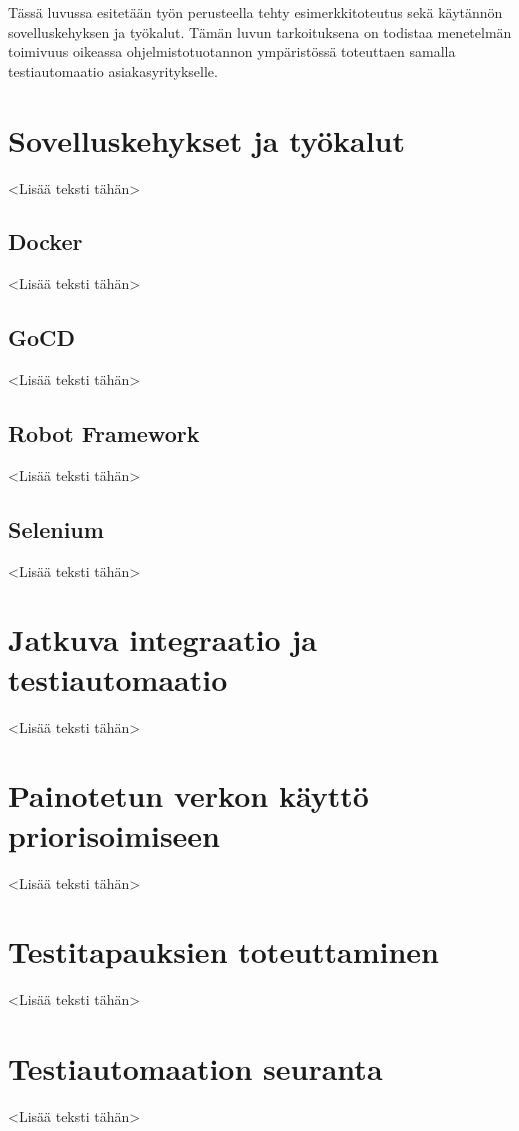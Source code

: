 Tässä luvussa esitetään työn perusteella tehty esimerkkitoteutus sekä käytännön sovelluskehyksen ja työkalut.
Tämän luvun tarkoituksena on todistaa menetelmän toimivuus oikeassa ohjelmistotuotannon ympäristössä toteuttaen samalla testiautomaatio asiakasyritykselle.

\section{Sovelluskehykset ja työkalut}

<Lisää teksti tähän>

  \subsection{Docker}

  <Lisää teksti tähän>

  \subsection{GoCD}

  <Lisää teksti tähän>

  \subsection{Robot Framework}

  <Lisää teksti tähän>

  \subsection{Selenium}

  <Lisää teksti tähän>

\section{Jatkuva integraatio ja testiautomaatio}

<Lisää teksti tähän>

\section{Painotetun verkon käyttö priorisoimiseen}

<Lisää teksti tähän>

\section{Testitapauksien toteuttaminen}

<Lisää teksti tähän>

\section{Testiautomaation seuranta}

<Lisää teksti tähän>
